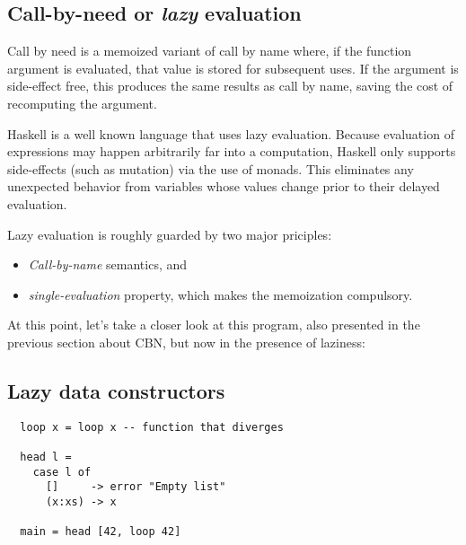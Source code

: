 \documentclass[diploma]{softlab-thesis}
\begin{document}
\subsection {Call-by-need or \textit{lazy} evaluation }

Call by need is a memoized variant of call by name where, if the function argument is evaluated, 
that value is stored for subsequent uses. If the argument is side-effect free, this produces the same results as call by name, 
saving the cost of recomputing the argument. 

Haskell is a well known language that uses lazy evaluation. Because evaluation of expressions may happen arbitrarily 
far into a computation, Haskell only supports side-effects (such as mutation) via the use of monads. This eliminates any 
unexpected behavior from variables whose values change prior to their delayed evaluation.
\newline
\par Lazy evaluation is roughly guarded by two major priciples:
\begin{itemize}
  \item \textit{Call-by-name} semantics, and
  \item \textit{single-evaluation} property, which makes the memoization compulsory.
\end{itemize}

At this point, let's take a closer look at this program, also presented in the previous section about CBN,
but now in the presence of laziness:

\subsection{Lazy data constructors}

\begin{verbatim}
  loop x = loop x -- function that diverges

  head l = 
    case l of 
      []     -> error "Empty list"
      (x:xs) -> x

  main = head [42, loop 42]
\end{verbatim}
\end{document}
